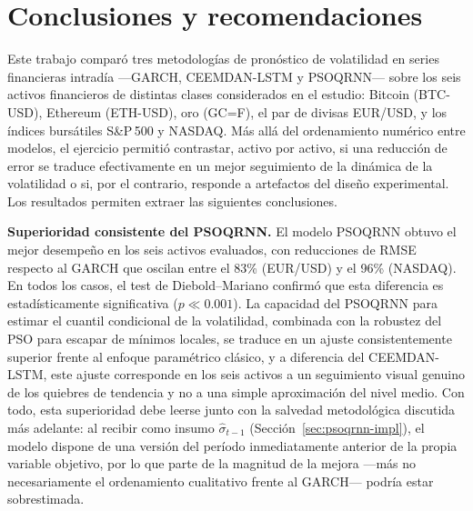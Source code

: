 \documentclass[12pt]{paper}
\begin{document}
\section{Conclusiones y recomendaciones}
\label{sec:conclusiones}

Este trabajo comparó tres metodologías de pronóstico de volatilidad en series financieras intradía —GARCH, CEEMDAN-LSTM y PSOQRNN— sobre los seis activos financieros de distintas clases considerados en el estudio: Bitcoin (BTC-USD), Ethereum (ETH-USD), oro (GC=F), el par de divisas EUR/USD, y los índices bursátiles S\&P\,500 y NASDAQ. Más allá del ordenamiento numérico entre modelos, el ejercicio permitió contrastar, activo por activo, si una reducción de error se traduce efectivamente en un mejor seguimiento de la dinámica de la volatilidad o si, por el contrario, responde a artefactos del diseño experimental. Los resultados permiten extraer las siguientes conclusiones.

\textbf{Superioridad consistente del PSOQRNN.} El modelo PSOQRNN obtuvo el mejor desempeño en los seis activos evaluados, con reducciones de RMSE respecto al GARCH que oscilan entre el 83\% (EUR/USD) y el 96\% (NASDAQ). En todos los casos, el test de Diebold--Mariano confirmó que esta diferencia es estadísticamente significativa ($p \ll 0.001$). La capacidad del PSOQRNN para estimar el cuantil condicional de la volatilidad, combinada con la robustez del PSO para escapar de mínimos locales, se traduce en un ajuste consistentemente superior frente al enfoque paramétrico clásico, y a diferencia del CEEMDAN-LSTM, este ajuste corresponde en los seis activos a un seguimiento visual genuino de los quiebres de tendencia y no a una simple aproximación del nivel medio. Con todo, esta superioridad debe leerse junto con la salvedad metodológica discutida más adelante: al recibir como insumo $\hat{\sigma}_{t-1}$ (Sección~\ref{sec:psoqrnn-impl}), el modelo dispone de una versión del período inmediatamente anterior de la propia variable objetivo, por lo que parte de la magnitud de la mejora —más no necesariamente el ordenamiento cualitativo frente al GARCH— podría estar sobrestimada.
\end{document}

